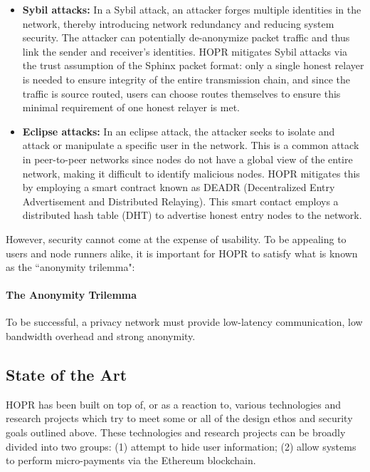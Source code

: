 \begin{itemize}
    \item \textbf{Sybil attacks:} In a Sybil attack, an attacker forges
    multiple identities in the network, thereby introducing network redundancy and
    reducing system security. The attacker can potentially de-anonymize packet traffic and thus link the sender and receiver's identities. HOPR mitigates Sybil attacks via the trust assumption of the Sphinx packet format: only a single honest relayer is needed to ensure integrity of the entire transmission chain, and since the traffic is source routed, users can choose routes themselves to ensure this minimal requirement of one honest relayer is met. 
    \item \textbf{Eclipse attacks:} In an eclipse attack, the attacker seeks to isolate and attack or
    manipulate a specific user in the network. This is a common
    attack in peer-to-peer networks since nodes do not have a global view of the entire network, making it difficult to identify
    malicious nodes. HOPR mitigates this by employing a smart contract known as DEADR (Decentralized Entry Advertisement and Distributed Relaying). This smart contact employs a distributed hash table (DHT) to advertise honest entry nodes to the network.
    
\end{itemize}
However, security cannot come at the expense of usability. To be appealing to users and node runners alike, it is important for HOPR to satisfy what is known as the ``anonymity trilemma":

\paragraph{The Anonymity Trilemma} \cite{AnonymityTrilemma} To be successful, a privacy network must provide low-latency
communication, low bandwidth overhead and strong anonymity.

\subsection{State of the Art}
\label{sec:stateoftheart}

HOPR has been built on top of, or as a reaction to, various technologies and research projects which try to meet some or all of the design ethos and security goals outlined above. These technologies and research projects can be broadly divided into two groups: (1)  attempt
to hide user information; (2)  allow systems
to perform micro-payments via the Ethereum blockchain.

